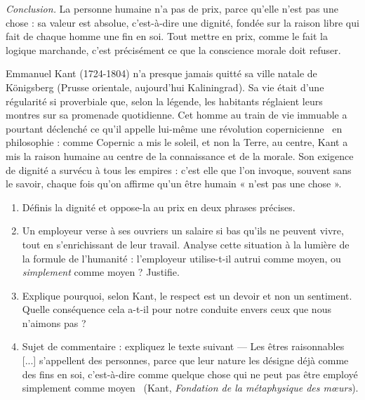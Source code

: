 \documentclass[11pt]{article}
\newcommand{\cle}[1]{{\popxbold\color{popdark}#1}}
\begin{document}
\begin{exoresolu}
\emph{Conclusion.} La personne humaine n'a pas de prix, parce qu'elle n'est pas une chose : sa valeur est absolue, c'est-à-dire une dignité, fondée sur la raison libre qui fait de chaque homme une fin en soi. Tout mettre en prix, comme le fait la logique marchande, c'est précisément ce que la conscience morale doit refuser.
\end{exoresolu}

\begin{savaistu}
Emmanuel Kant (1724-1804) n'a presque jamais quitté sa ville natale de Königsberg (Prusse orientale, aujourd'hui Kaliningrad). Sa vie était d'une régularité si proverbiale que, selon la légende, les habitants réglaient leurs montres sur sa promenade quotidienne. Cet homme au train de vie immuable a pourtant déclenché ce qu'il appelle lui-même une \guillemotleft révolution copernicienne \guillemotright\ en philosophie : comme Copernic a mis le soleil, et non la Terre, au centre, Kant a mis la raison humaine au centre de la connaissance et de la morale. Son exigence de dignité a survécu à tous les empires : c'est elle que l'on invoque, souvent sans le savoir, chaque fois qu'on affirme qu'un être humain « n'est pas une chose ».
\end{savaistu}

\begin{exercice}
\begin{enumerate}
\item Définis la \cle{dignité} et oppose-la au \cle{prix} en deux phrases précises.
\item Un employeur verse à ses ouvriers un salaire si bas qu'ils ne peuvent vivre, tout en s'enrichissant de leur travail. Analyse cette situation à la lumière de la formule de l'humanité : l'employeur utilise-t-il autrui comme moyen, ou \emph{simplement} comme moyen ? Justifie.
\item Explique pourquoi, selon Kant, le respect est un devoir et non un sentiment. Quelle conséquence cela a-t-il pour notre conduite envers ceux que nous n'aimons pas ?
\item Sujet de commentaire : expliquez le texte suivant — \guillemotleft Les êtres raisonnables [...] s'appellent des personnes, parce que leur nature les désigne déjà comme des fins en soi, c'est-à-dire comme quelque chose qui ne peut pas être employé simplement comme moyen \guillemotright\ (Kant, \emph{Fondation de la métaphysique des mœurs}).
\end{enumerate}
\end{exercice}
\end{document}

